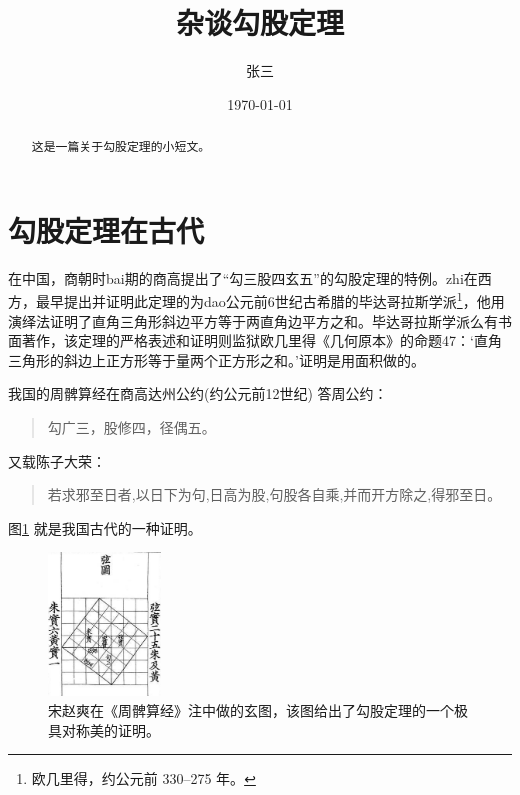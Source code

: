 \documentclass[UTF8]{ctexart}
\title{\heiti 杂谈勾股定理}
\author{\kaishu 张三}
\date{\today}
\newenvironment{myquote}
	{\begin{quote}\kaishu\zihao{-5}}
	{\end{quote}}
\begin{document}
	\maketitle
	\begin{abstract}
		\centering
		这是一篇关于勾股定理的小短文。
	\end{abstract}
	\tableofcontents
	\section{勾股定理在古代}\label{sec:gudai}
	在中国，商朝时bai期的商高提出了“勾三股四玄五”的勾股定理的特例。zhi在西方，最早提出并证明此定理的为dao公元前6世纪古希腊的\cite{quanjing}毕达哥拉斯学派\footnote{欧几里得，约公元前 330--275 年。}，他用演绎法证明了直角三角形斜边平方等于两直角边平方之和。毕达哥拉斯学派么有书面著作，该定理的严格表述和证明则监狱欧几里得《几何原本》的命题47：‘直角三角形的斜边上正方形等于量两个正方形之和。’证明是用面积做的。

	我国的周髀算经在商高达州公约(约公元前12世纪) 答周公约：
	\begin{myquote}
		勾广三，股修四，径偶五。
	\end{myquote}
	又载陈子大荣：

	\begin{myquote}
		若求邪至日者,以日下为句,日高为股,句股各自乘,并而开方除之,得邪至日。
	\end{myquote}
	
	图\ref{fig:xiantu} 就是我国古代的一种证明。
	\begin{figure}[ht]
		\centering
		\includegraphics[width=3cm]{zhoubi.png}
		\caption{\kaishu 宋赵爽在《周髀算经》注中做的玄图，该图给出了勾股定理的一个极具对称美的证明。}
		\label{fig:xiantu}
	\end{figure}
	
\end{document}
